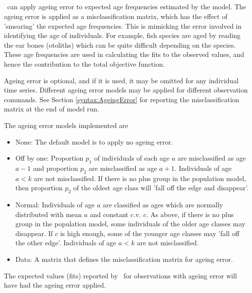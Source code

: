 \subsection{}\label{sec:AgeingError}

\CNAME\ can apply ageing error to expected age frequencies estimated by the model. The ageing error is applied as a misclassification matrix, which has the effect of 'smearing' the expected age frequencies. This is mimicking the error involved in identifying the age of individuals. For example, fish species are aged by reading the ear bones (otoliths) which can be quite difficult depending on the species. These age frequencies are used in calculating the fits to the observed values, and hence the contribution to the total objective function.

Ageing error is optional, and if it is used, it may be omitted for any individual time series. Different ageing error models may be applied for different observation commands. See Section \ref{syntax:AgeingError} for reporting the misclassification matrix at the end of model run.

The ageing error models implemented are

\begin{itemize}
  \item{None}: The default model is to apply no ageing error.\label{sec:AgeingError-None}
  \item{Off by one}: Proportion $p_1$ of individuals of each age $a$ are misclassified as age $a-1$ and proportion $p_2$ are misclassified as age $a+1$. Individuals of age $a < k$ are not misclassified. If there is no plus group in the population model, then proportion $p_2$ of the oldest age class will 'fall off the edge and disappear'.\label{sec:AgeingError-OffByOne}
  \item{Normal}: Individuals of age $a$ are classified as ages which are normally distributed with mean $a$ and constant c.v. $c$. As above, if there is no plus group in the population model, some individuals of the older age classes may disappear. If $c$ is high enough, some of the younger age classes may 'fall off the other edge'. Individuals of age $a < k$ are not misclassified.\label{sec:AgeingError-Normal}
  \item{Data}: A matrix that defines the misclassification matrix for ageing error\label{sec:AgeingError-Data}.
\end{itemize}

The expected values (fits) reported by \CNAME\ for observations with ageing error will have had the ageing error applied.

